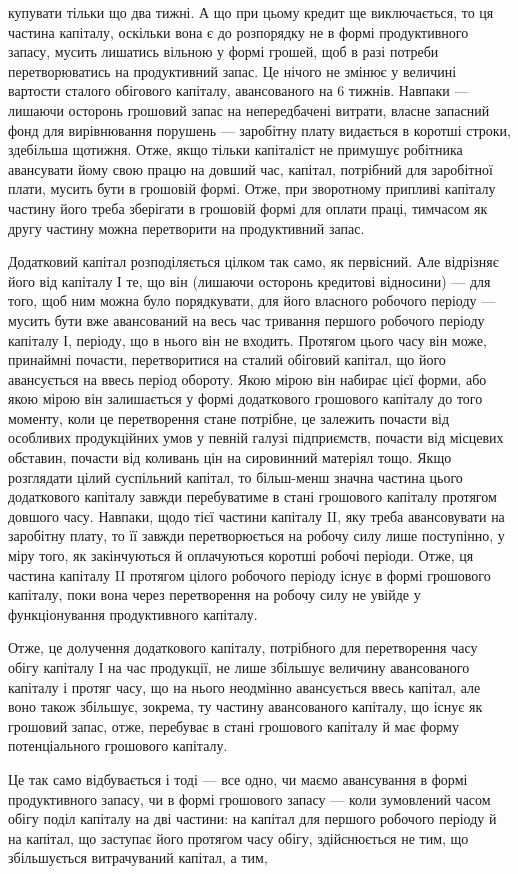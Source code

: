 \parcont{}  %
купувати тільки що два тижні. А що при цьому кредит ще виключається,
то ця частина капіталу, оскільки вона є до розпорядку не в формі продуктивного
запасу, мусить лишатись вільною у формі грошей, щоб в разі
потреби перетворюватись на продуктивний запас. Це нічого не змінює у
величині вартости сталого обігового капіталу, авансованого на 6 тижнів.
Навпаки — лишаючи осторонь грошовий запас на непередбачені витрати,
власне запасний фонд для вирівнювання порушень — заробітну плату видається
в коротші строки, здебільша щотижня. Отже, якщо тільки капіталіст
не примушує робітника авансувати йому свою працю на довший час,
капітал, потрібний для заробітної плати, мусить бути в грошовій формі.
Отже, при зворотному припливі капіталу частину його треба зберігати в
грошовій формі для оплати праці, тимчасом як другу частину можна перетворити
на продуктивний запас.

Додатковий капітал розподіляється цілком так само, як первісний.
Але відрізняє його від капіталу І те, що він (лишаючи осторонь кредитові
відносини) — для того, щоб ним можна було порядкувати, для його
власного робочого періоду — мусить бути вже авансований на весь
час тривання першого робочого періоду капіталу І, періоду, що в нього
він не входить. Протягом цього часу він може, принаймні почасти,
перетворитися на сталий обіговий капітал, що його авансується на ввесь
період обороту. Якою мірою він набирає цієї форми, або якою мірою
він залишається у формі додаткового грошового капіталу до того моменту,
коли це перетворення стане потрібне, це залежить почасти від
особливих продукційних умов у певній галузі підприємств, почасти від
місцевих обставин, почасти від коливань цін на сировинний матеріял тощо.
Якщо розглядати цілий суспільний капітал, то більш-менш значна частина
цього додаткового капіталу завжди перебуватиме в стані грошового
капіталу протягом довшого часу. Навпаки, щодо тієї частини капіталу II,
яку треба авансовувати на заробітну плату, то її завжди перетворюється
на робочу силу лише поступінно, у міру того, як закінчуються й оплачуються
коротші робочі періоди. Отже, ця частина капіталу II протягом
цілого робочого періоду існує в формі грошового капіталу, поки вона
через перетворення на робочу силу не увійде у функціонування продуктивного
капіталу.

Отже, це долучення додаткового капіталу, потрібного для перетворення
часу обігу капіталу І на час продукції, не лише збільшує величину
авансованого капіталу і протяг часу, що на нього неодмінно авансується
ввесь капітал, але воно також збільшує, зокрема, ту частину
авансованого капіталу, що існує як грошовий запас, отже, перебуває
в стані грошового капіталу й має форму потенціального грошового
капіталу.

Це так само відбувається і тоді — все одно, чи маємо авансування в
формі продуктивного запасу, чи в формі грошового запасу — коли зумовлений
часом обігу поділ капіталу на дві частини: на капітал для першого
робочого періоду й на капітал, що заступає його протягом часу
обігу, здійснюється не тим, що збільшується витрачуваний капітал, а тим,
\parbreak{}  %
